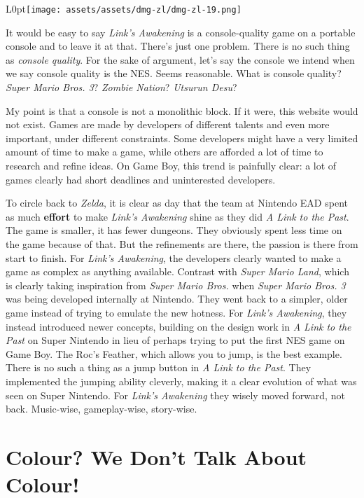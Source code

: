 \documentclass{book}
\begin{document}
\begin{wrapfigure}{L}{0pt}{\texttt{[image: assets/assets/dmg-zl/dmg-zl-19.png]}}\end{wrapfigure}\noindent
It would be easy to say \emph{Link’s Awakening} is a console-quality game on a portable console and to leave it at that. There’s just one problem. There is no such thing as \emph{console quality}. For the sake of argument, let’s say the console we intend when we say console quality is the NES. Seems reasonable. What is console quality? \emph{Super Mario Bros. 3}? \emph{Zombie Nation}? \emph{Utsurun Desu}?\par
My point is that a console is not a monolithic block. If it were, this website would not exist. Games are made by developers of different talents and even more important, under different constraints. Some developers might have a very limited amount of time to make a game, while others are afforded a lot of time to research and refine ideas. On Game Boy, this trend is painfully clear: a lot of games clearly had short deadlines and uninterested developers.\par
To circle back to \emph{Zelda}, it is clear as day that the team at Nintendo EAD spent as much \textbf{effort} to make \emph{Link’s Awakening} shine as they did \emph{A Link to the Past}. The game is smaller, it has fewer dungeons. They obviously spent less time on the game because of that. But the refinements are there, the passion is there from start to finish. For \emph{Link’s Awakening}, the developers clearly wanted to make a game as complex as anything available. Contrast with \emph{Super Mario Land}, which is clearly taking inspiration from \emph{Super Mario Bros.} when \emph{Super Mario Bros. 3} was being developed internally at Nintendo. They went back to a simpler, older game instead of trying to emulate the new hotness. For \emph{Link’s Awakening}, they instead introduced newer concepts, building on the design work in \emph{A Link to the Past} on Super Nintendo in lieu of perhaps trying to put the first NES game on Game Boy. The Roc’s Feather, which allows you to jump, is the best example. There is no such a thing as a jump button in \emph{A Link to the Past}. They implemented the jumping ability cleverly, making it a clear evolution of what was seen on Super Nintendo. For \emph{Link’s Awakening} they wisely moved forward, not back. Music-wise, gameplay-wise, story-wise.\par
\FloatBarrier\section*{Colour? We Don’t Talk About Colour!}
\end{document}
